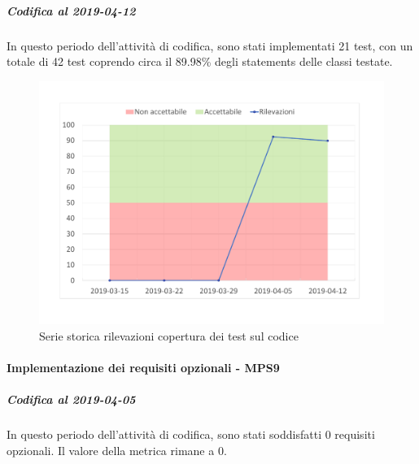 \subparagraph{Codifica al 2019-04-12}
In questo periodo dell'attività di codifica, sono stati implementati 21 test, con un totale di 42 test coprendo circa il 89.98\% degli statements delle classi testate.
\begin{figure}[H]
	\centering
	\includegraphics[scale=0.6]{images/resoconto/MPS8Chart.pdf}
	\caption{Serie storica rilevazioni copertura dei test sul codice}	
\end{figure}


\paragraph{Implementazione dei requisiti opzionali - MPS9}
\subparagraph{Codifica al 2019-04-05}
In questo periodo dell'attività di codifica, sono stati soddisfatti 0 requisiti opzionali. Il valore della metrica rimane a 0.

